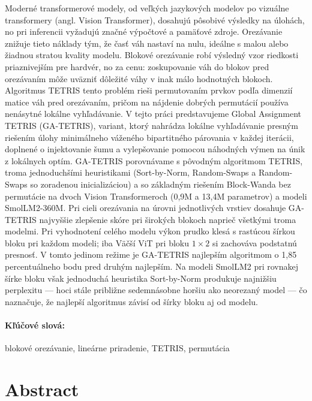 \documentclass[12pt, twoside]{book}
\begin{document}
Moderné transformerové modely, od veľkých jazykových modelov po vizuálne transformery (angl. Vision Transformer), dosahujú pôsobivé výsledky na úlohách, no pri inferencii vyžadujú značné výpočtové a pamäťové zdroje. Orezávanie znižuje tieto náklady tým, že časť váh nastaví na nulu, ideálne s malou alebo žiadnou stratou kvality modelu. Blokové orezávanie robí výsledný vzor riedkosti priaznivejším pre hardvér, no za cenu: zoskupovanie váh do blokov pred orezávaním môže uväzniť dôležité váhy v inak málo hodnotných blokoch. Algoritmus TETRIS \cite{tetris} tento problém rieši permutovaním prvkov podľa dimenzií matice váh pred orezávaním, pričom na nájdenie dobrých permutácií používa nenásytné lokálne vyhľadávanie. V tejto práci predstavujeme Global Assignment TETRIS (GA-TETRIS), variant, ktorý nahrádza lokálne vyhľadávanie presným riešením úlohy minimálneho váženého bipartitného párovania v každej iterácii, doplnené o injektovanie šumu a vylepšovanie pomocou náhodných výmen na únik z lokálnych optím. GA-TETRIS porovnávame s pôvodným algoritmom TETRIS, troma jednoduchšími heuristikami (Sort-by-Norm, Random-Swaps a Random-Swaps so zoradenou inicializáciou) a so základným riešením Block-Wanda bez permutácie na dvoch Vision Transformeroch (0,9M a 13,4M parametrov) a modeli SmolLM2-360M. Pri cieli orezávania na úrovni jednotlivých vrstiev dosahuje GA-TETRIS najvyššie zlepšenie skóre pri širokých blokoch naprieč všetkými troma modelmi. Pri vyhodnotení celého modelu výkon prudko klesá s rastúcou šírkou bloku pri každom modeli; iba Väčší ViT pri bloku $1 \times 2$ si zachováva podstatnú presnosť. V tomto jedinom režime je GA-TETRIS najlepším algoritmom o 1,85 percentuálneho bodu pred druhým najlepším. Na modeli SmolLM2 pri rovnakej šírke bloku však jednoduchá heuristika Sort-by-Norm produkuje najnižšiu perplexitu — hoci stále približne sedemnásobne horšiu ako neorezaný model — čo naznačuje, že najlepší algoritmus závisí od šírky bloku aj od modelu.

\paragraph*{Kľúčové slová:} blokové orezávanie, lineárne priradenie, TETRIS, permutácia


\newpage 
\section*{Abstract}
\end{document}
